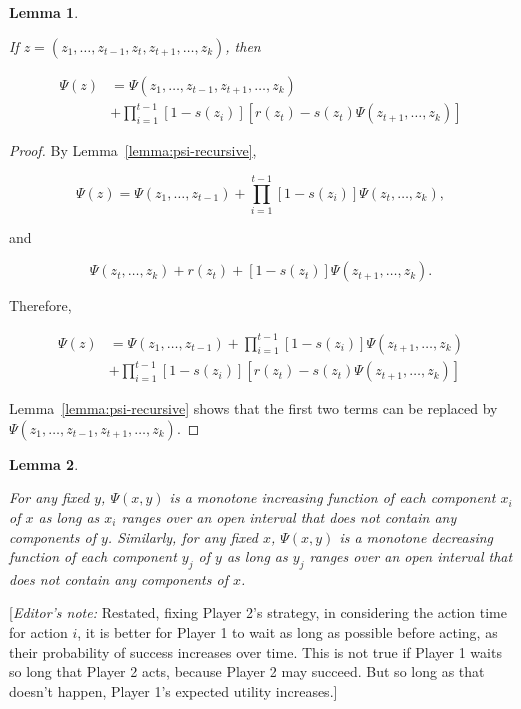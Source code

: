 \documentclass{article}
\newtheorem{lemma}{Lemma}
\theoremstyle{remark}
\begin{document}
\begin{lemma} \label{lemma:psi-remove-one}

If $z = (z_1, \dots, z_{t-1}, z_t, z_{t+1}, \dots, z_k)$, then

\[
\begin{aligned}
\Psi(z) &= \Psi(z_1, \dots, z_{t-1}, z_{t+1}, \dots, z_k)  \\
&+ \prod_{i=1}^{t-1} [1 - s(z_i)] [r(z_t) - s(z_t) \Psi(z_{t+1}, \dots, z_k)]
\end{aligned}
\]

\end{lemma}

\begin{proof}

By Lemma~\ref{lemma:psi-recursive},

\[
\Psi(z) = \Psi(z_1, \dots, z_{t-1}) +
\prod_{i=1}^{t-1} [1-s(z_i)] \Psi(z_t, \dots, z_k),
\]

and

\[
\Psi(z_t, \dots, z_k) +
r(z_t) + [1-s(z_t)] \Psi(z_{t+1}, \dots, z_k).
\]

Therefore,

\[
\begin{aligned}
\Psi(z) &= \Psi(z_1, \dots, z_{t-1}) +
\prod_{i=1}^{t-1} [1 - s(z_i)] \Psi(z_{t+1}, \dots, z_k) \\
&+ \prod_{i=1}^{t-1} [1 - s(z_i)] [r(z_t) - s(z_t) \Psi(z_{t+1}, \dots, z_k)]
\end{aligned}
\]

Lemma~\ref{lemma:psi-recursive} shows that the first two terms can be replaced
by \\ $\Psi(z_1, \dots, z_{t-1}, z_{t+1}, \dots, z_k)$.

\end{proof}


\begin{lemma} \label{lemma:psi-monotone-increasing}

For any fixed $y$, $\Psi(x, y)$ is a monotone increasing function of each
component $x_i$ of $x$ as long as $x_i$ ranges over an open interval that does
not contain any components of $y$. Similarly, for any fixed $x$, $\Psi(x, y)$
is a monotone decreasing function of each component $y_j$ of $y$ as long as
$y_j$ ranges over an open interval that does not contain any components of $x$.

\end{lemma}

[\emph{Editor's note:} Restated, fixing Player 2's strategy, in considering the
action time for action $i$, it is better for Player 1 to wait as long as
possible before acting, as their probability of success increases over time.
This is not true if Player 1 waits so long that Player 2 acts, because
Player 2 may succeed. But so long as that doesn't happen, Player 1's expected
utility increases.]
\end{document}
